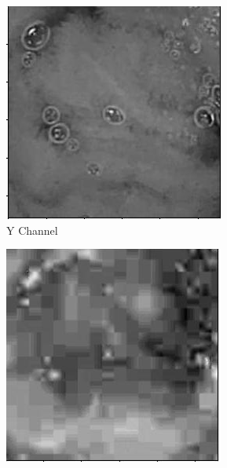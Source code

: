 \begin{figure}[H]
  \begin{subfigure}[b]{0.3\textwidth}
    \includegraphics[width=\textwidth]{Chapter6/Y_9.png}
    \caption{Y Channel}
  \end{subfigure}
  \begin{subfigure}[b]{0.3\textwidth}
    \includegraphics[width=\textwidth]{Chapter6/CB_9.png}

\end{subfigure}
\end{figure}
